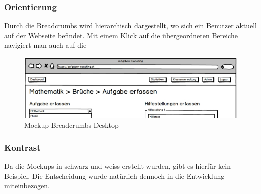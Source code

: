 \subsubsection*{Orientierung} 
Durch die Breadcrumbs wird hierarchisch dargestellt, wo sich ein Benutzer aktuell auf der Webseite befindet. Mit einem Klick auf die übergeordneten Bereiche navigiert man auch auf die \\
\begin{minipage}{\textwidth}
	\begin{figure}[H]
	\centering
		\includegraphics[width=\textwidth, keepaspectratio]{images/Mockups/Breadcrumbs_Desktop.png}
		\caption{Mockup Breadcrumbs Desktop}
	\end{figure}
\end{minipage}


\subsubsection*{Kontrast}
Da die Mockups in schwarz und weiss erstellt wurden, gibt es hierfür kein Beispiel. Die Entscheidung wurde natürlich dennoch in die Entwicklung miteinbezogen.


\newpage